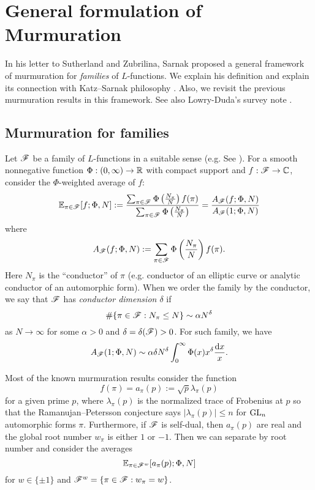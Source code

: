 \section{General formulation of Murmuration}
\label{sec:general}

In his letter to Sutherland and Zubrilina, Sarnak proposed a general framework of murmuration \cite{sarnak} for \emph{families} of $L$-functions.
We explain his definition and explain its connection with Katz--Sarnak philosophy \cite{katz1999zeroes,katz2023random}.
Also, we revisit the previous murmuration results \cite{zubrilina2025murmurations,lee2025murmurations,sawin2025murmurations} in this framework.
See also Lowry-Duda's survey note \cite{lowry2025murmurations}.

\subsection{Murmuration for families}

Let $\mathscr{F}$ be a family of $L$-functions in a suitable sense (e.g. See \cite{sarnak2016families}).
For a smooth nonnegative function $\Phi : (0, \infty) \to \mathbb{R}$ with compact support and $f : \mathscr{F} \to \mathbb{C}$, consider the $\Phi$-weighted average of $f$:
\begin{equation}
    \mathbb{E}_{\pi \in \mathscr{F}}[f; \Phi, N] := \frac{\sum_{\pi \in \mathscr{F}} \Phi\left(\frac{N_\pi}{N}\right)f(\pi)}{\sum_{\pi \in \mathscr{F}} \Phi\left(\frac{N_\pi}{N}\right)} = \frac{A_{\mathscr{F}}(f; \Phi, N)}{A_{\mathscr{F}}(1; \Phi, N)}
\end{equation}
where
\begin{equation}
    A_{\mathscr{F}}(f; \Phi, N) := \sum_{\pi \in \mathscr{F}} \Phi\left(\frac{N_\pi}{N}\right)f(\pi).
\end{equation}
Here $N_\pi$ is the ``conductor'' of $\pi$ (e.g. conductor of an elliptic curve or analytic conductor of an automorphic form).
When we order the family by the conductor, we say that $\mathscr{F}$ has \emph{conductor dimension $\delta$} if
\begin{equation}
    \# \{\pi \in \mathscr{F} : N_\pi \le N\} \sim \alpha N^\delta
\end{equation}
as $N \to \infty$ for some $\alpha > 0$ and $\delta = \delta(\mathscr{F}) > 0$.
For such family, we have
\[
A_{\mathscr{F}}(1; \Phi, N) \sim \alpha \delta N^\delta \int_0^\infty \Phi(x) x^\delta \frac{\mathrm{d} x}{x}.
\]

Most of the known murmuration results consider the function
\begin{equation}
    f(\pi) = a_\pi(p) := \sqrt{p} \lambda_\pi(p)
\end{equation}
for a given prime $p$, where $\lambda_\pi(p)$ is the normalized trace of Frobenius at $p$ so that the Ramanujan--Petersson conjecture says $|\lambda_\pi(p)| \le n$ for $\mathrm{GL}_n$ automorphic forms $\pi$.
Furthermore, if $\mathscr{F}$ is self-dual, then $a_\pi(p)$ are real and the global root number $w_\pi$ is either $1$ or $-1$.
Then we can separate by root number and consider the averages
\begin{equation}
    \mathbb{E}_{\pi \in \mathscr{F}^w} [a_\pi(p); \Phi, N]
\end{equation}
for $w \in \{\pm 1\}$ and $\mathscr{F}^w = \{\pi \in \mathscr{F} : w_\pi = w\}$.

